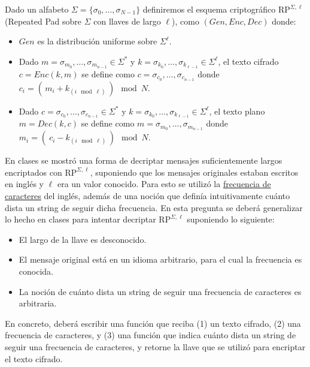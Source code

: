 

Dado un alfabeto $\Sigma=\{\sigma_0,\ldots,\sigma_{N-1}\}$ definiremos el esquema criptográfico $\text{RP}^{\Sigma, \ell}$ (Repeated Pad sobre $\Sigma$ con llaves de largo $\ell$), como $(Gen, Enc, Dec)$ donde:
\begin{itemize}
  \item $Gen$ es la distribución uniforme sobre $\Sigma^\ell$.
  \item Dado $m=\sigma_{m_0},\ldots,\sigma_{m_{n-1}}\in\Sigma^*$ y $k=\sigma_{k_0},\ldots,\sigma_{k_{\ell-1}}\in\Sigma^\ell$, el texto cifrado $c=Enc(k, m)$ se define como $c=\sigma_{c_0},\ldots,\sigma_{c_{n-1}}$ donde $c_i=(\,m_i + k_{(i \!\mod \ell)}\,)\mod N$.
  \item Dado $c=\sigma_{c_0},\ldots,\sigma_{c_{n-1}}\in\Sigma^*$ y $k=\sigma_{k_0},\ldots,\sigma_{k_{\ell-1}}\in\Sigma^\ell$, el texto plano $m=Dec(k, c)$ se define como $m=\sigma_{m_0},\ldots,\sigma_{m_{n-1}}$ donde $m_i=(\ c_i - k_{(i\!\mod \ell)}\,)\mod N$.
  
\end{itemize}

En clases se mostró una forma de decriptar mensajes suficientemente largos encriptados con $\text{RP}^{\Sigma,\ell}$, suponiendo que los mensajes originales estaban escritos en inglés y $\ell$ era un valor conocido. Para esto se utilizó la \href{https://en.wikipedia.org/wiki/Letter_frequency}{frecuencia de caracteres} del inglés, además de una noción que definía intuitivamente cuánto dista un string de seguir dicha frecuencia. En esta pregunta se deberá generalizar lo hecho en clases para intentar decriptar $\text{RP}^{\Sigma, \ell}$ suponiendo lo siguiente:

\begin{itemize}
  \item El largo de la llave es desconocido.
  \item El mensaje original está en un idioma arbitrario, para el cual la frecuencia es conocida.
  \item La noción de cuánto dista un string de seguir una frecuencia de caracteres es arbitraria.
\end{itemize}

En concreto, deberá escribir una función que reciba (1) un texto cifrado, (2) una frecuencia de caracteres, y (3) una función que indica cuánto dista un string de seguir una frecuencia de caracteres, y retorne la llave que se utilizó para encriptar el texto cifrado.

